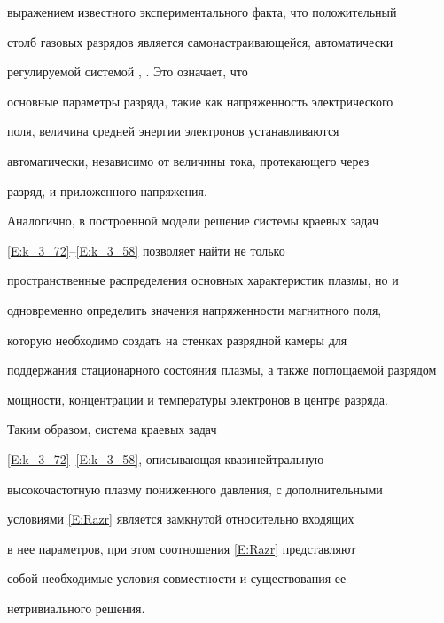 выражением известного экспериментального факта, что положительный


столб газовых разрядов является самонастраивающейся, автоматически


регулируемой системой \cite{k_301}, \cite{k_249}. Это означает, что


основные параметры разряда, такие как напряженность электрического


поля, величина средней энергии электронов устанавливаются


автоматически, независимо от величины тока, протекающего через


разряд, и приложенного напряжения.





Аналогично, в построенной модели решение системы краевых задач


\eqref{E:k_3_72}--\eqref{E:k_3_58} позволяет найти не только


пространственные распределения основных характеристик плазмы, но и


одновременно определить значения напряженности магнитного поля,


которую необходимо создать на стенках разрядной камеры для


поддержания стационарного состояния плазмы, а также поглощаемой разрядом


мощности, концентрации и температуры электронов в центре разряда.








Таким образом, система краевых задач


\eqref{E:k_3_72}--\eqref{E:k_3_58}, описывающая квазинейтральную


высокочастотную плазму пониженного давления, с дополнительными


условиями \eqref{E:Razr} является замкнутой относительно входящих


в нее параметров, при этом соотношения \eqref{E:Razr} представляют


собой необходимые условия совместности и существования ее


нетривиального решения.








